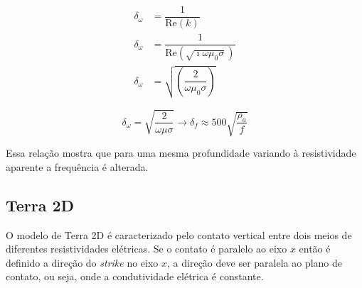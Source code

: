 	\begin{align*}
	 \delta_\omega & = \dfrac{1}{\textrm{Re}(k)} \\
	  \delta_\omega & = \dfrac{1}{\textrm{Re} \left (\sqrt{\imath \omega \mu_0 \sigma} \right)}  \\
	  \delta_\omega & = \sqrt{ \left (\dfrac{2}{\omega \mu_0 \sigma} \right )}
	\end{align*}

	
	\begin{equation}
	 \label{rela_prof_periodo}
	 \delta_\omega = \sqrt{\frac{2}{\omega \mu \sigma}} \longrightarrow \delta_f \approx 500  \sqrt{\frac{\rho_a}{f}}
	\end{equation}
	
	Essa relação mostra que para uma mesma profundidade variando à resistividade
	aparente a frequência é alterada.
        
   
        \subsection{Terra 2D}
        
        O modelo de Terra 2D é caracterizado pelo contato vertical entre dois meios de diferentes resistividades elétricas. Se o contato é
	    paralelo ao eixo $x$ então é definido a direção do \textit{strike} no eixo $x$, a direção deve ser paralela ao plano de contato,
	    ou seja, onde a condutividade elétrica é constante.
	    
